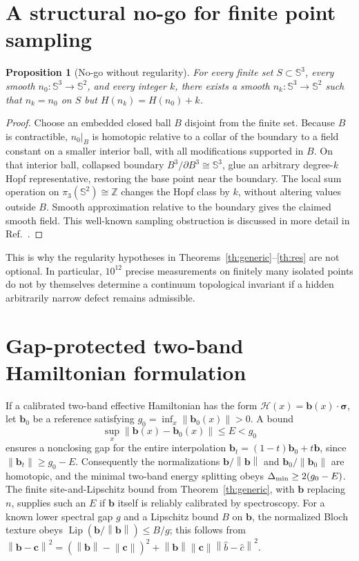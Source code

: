 \documentclass[aps,prd,onecolumn,notitlepage,11pt,superscriptaddress,longbibliography]{revtex4-2}
\newtheorem{proposition}{Proposition}
\newcommand{\Sph}{\mathbb S}
\newcommand{\norm}[1]{\left\lVert#1\right\rVert}
\begin{document}
\section{A structural no-go for finite point sampling}
\begin{proposition}[No-go without regularity]\label{prop:nogo}
For every finite set $S\subset\Sph^3$, every smooth $n_0:\Sph^3\to\Sph^2$, and every integer $k$, there exists a smooth $n_k:\Sph^3\to\Sph^2$ such that $n_k=n_0$ on $S$ but $H(n_k)=H(n_0)+k$.
\end{proposition}
\begin{proof}
Choose an embedded closed ball $B$ disjoint from the finite set. Because $B$ is contractible, $n_0|_B$ is homotopic relative to a collar of the boundary to a field constant on a smaller interior ball, with all modifications supported in $B$. On that interior ball, collapsed boundary $B^3/\partial B^3\cong\Sph^3$, glue an arbitrary degree-$k$ Hopf representative, restoring the base point near the boundary. The local sum operation on $\pi_3(\Sph^2)\cong\mathbb Z$ changes the Hopf class by $k$, without altering values outside $B$. Smooth approximation relative to the boundary gives the claimed smooth field. This well-known sampling obstruction is discussed in more detail in Ref.~\cite{Klemm2026}.
\end{proof}

This is why the regularity hypotheses in Theorems~\ref{th:generic}--\ref{th:res} are not optional. In particular, $10^{12}$ precise measurements on finitely many isolated points do not by themselves determine a continuum topological invariant if a hidden arbitrarily narrow defect remains admissible.

\section{Gap-protected two-band Hamiltonian formulation}
If a calibrated two-band effective Hamiltonian has the form $\mathcal H(x)=\bm b(x)\cdot\bm\sigma$, let $\bm b_0$ be a reference satisfying $g_0=\inf_x\norm{\bm b_0(x)}>0$. A bound
\begin{equation}\label{eq:gap}
\sup_x\norm{\bm b(x)-\bm b_0(x)}\le E<g_0
\end{equation}
ensures a nonclosing gap for the entire interpolation $\bm b_t=(1-t)\bm b_0+t\bm b$, since $\norm{\bm b_t}\ge g_0-E$. Consequently the normalizations $\bm b/\norm{\bm b}$ and $\bm b_0/\norm{\bm b_0}$ are homotopic, and the minimal two-band energy splitting obeys $\Delta_{\rm min}\ge2(g_0-E)$. The finite site-and-Lipschitz bound from Theorem~\ref{th:generic}, with $\bm b$ replacing $n$, supplies such an $E$ if $\bm b$ itself is reliably calibrated by spectroscopy. For a known lower spectral gap $g$ and a Lipschitz bound $B$ on $\bm b$, the normalized Bloch texture obeys $\operatorname{Lip}(\bm b/\norm{\bm b})\le B/g$; this follows from $\norm{\bm b-\bm c}^2=(\norm{\bm b}-\norm{\bm c})^2+\norm{\bm b}\norm{\bm c}\norm{\widehat b-\widehat c}^2$.
\end{document}
